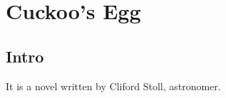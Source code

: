 \chapter{Cuckoo's Egg}
\label{chp:b1}

\section{Intro}

It is a novel written by Cliford Stoll, astronomer.
